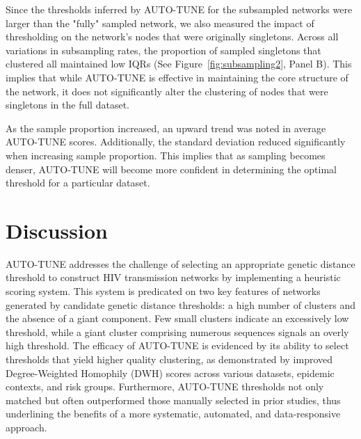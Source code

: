 \documentclass[utf8]{FrontiersinHarvard} %
\newcommand{\TODO}[1]{{\color{red}{#1}}}
\begin{document}
Since the thresholds inferred by AUTO-TUNE for the subsampled networks were
larger than the "fully" sampled network, we also measured the impact of
thresholding on the network's nodes that were originally singletons. Across all
variations in subsampling rates, the proportion of sampled singletons that
clustered all maintained low IQRs (See Figure~\ref{fig:subsampling2}, Panel B).
This implies that while AUTO-TUNE is effective in maintaining the core
structure of the network, it does not significantly alter the clustering of
nodes that were singletons in the full dataset.

As the sample proportion increased, an upward trend was noted in average
AUTO-TUNE scores. Additionally, the standard deviation reduced significantly
when increasing sample proportion. This implies that as sampling becomes
denser, AUTO-TUNE will become more confident in determining the optimal
threshold for a particular dataset.

\section{Discussion}

\TODO{NEEDS REVIEW}


AUTO-TUNE addresses the challenge of selecting an appropriate genetic distance
threshold to construct HIV transmission networks by implementing a heuristic
scoring system. This system is predicated on two key features of networks
generated by candidate genetic distance thresholds: a high number of clusters
and the absence of a giant component. Few small clusters indicate an
excessively low threshold, while a giant cluster comprising numerous sequences
signals an overly high threshold. The efficacy of AUTO-TUNE is evidenced by its
ability to select thresholds that yield higher quality clustering, as
demonstrated by improved Degree-Weighted Homophily (DWH) scores across various
datasets, epidemic contexts, and risk groups. Furthermore, AUTO-TUNE thresholds
not only matched but often outperformed those manually selected in prior
studies, thus underlining the benefits of a more systematic, automated, and
data-responsive approach.
\end{document}
